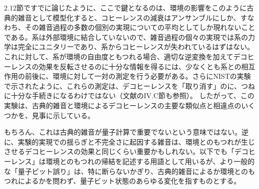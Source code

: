 2.12節ですでに論じたように、ここで鍵となるのは、環境の影響をこのように古典的雑音として模型化すると、コヒーレンスの減衰はアンサンブルにしか、すなわち、その雑音過程の多数の個別の実現についての平均としてしか現れないことである。系は外部環境に結合していないので、雑音過程の個々の実現では系の力学は完全にユニタリーであり、系からコヒーレンスが失われているはずはない。これに対して、系が環境の自由度ともつれる場合、適切な逆変換を加えてデコヒーレンスの効果を反転させるのに十分な情報を得るには、少なくとも系との相互作用の前後に、環境に対して一対の測定を行う必要がある。さらにNISTの実験\cite{ref125}で示されたように、これらの測定は、デコヒーレンスを「取り消す」のに、つねに十分な手続きになるわけではない（文献\cite{ref016}のIV.C節も参照）。
\hypertarget{srcpage:304}{}\label{srcpage:304}
したがって、この実験は、古典的雑音と環境によるデコヒーレンスの主要な類似点と相違点のいくつかを、見事に示している。

もちろん、これは古典的雑音が量子計算で重要でないという意味ではない。逆に、実験的実現での揺らぎと不完全さに起因する雑音は、環境とのもつれが生じさせるデコヒーレンスの効果と同じくらい重要かもしれない。以下でも「デコヒーレンス」は環境とのもつれの帰結を記述する用語として用いるが、より一般的な「量子ビット誤り」は、特に断らないかぎり、古典的雑音によるか環境とのもつれによるかを問わず、量子ビット状態のあらゆる変化を指すものとする。
